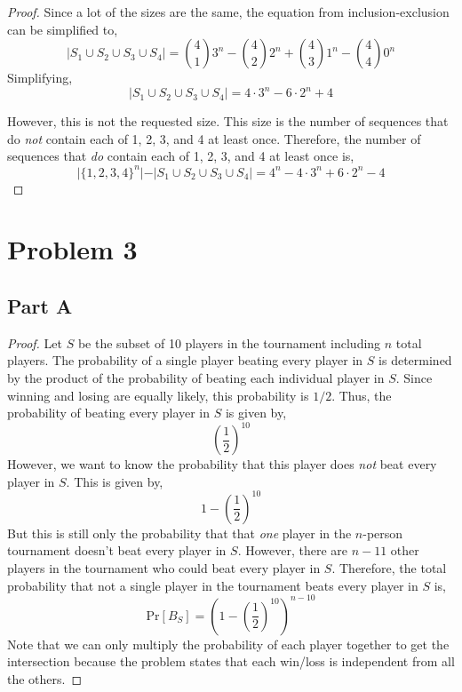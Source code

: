 \documentclass{article}
\begin{document}
\begin{proof}
  Since a lot of the sizes are the same, the equation from inclusion-exclusion
  can be simplified to,
  $$ \vert S_1 \cup S_2 \cup S_3 \cup S_4 \vert = \binom{4}{1} 3^n -
  \binom{4}{2} 2^n + \binom{4}{3} 1^n - \binom{4}{4} 0^n $$
  Simplifying,
  $$ \vert S_1 \cup S_2 \cup S_3 \cup S_4 \vert = 4 \cdot 3^n - 6 \cdot 2^n + 4
  $$

  However, this is not the requested size. This size is the number of sequences
  that do \textit{not} contain each of 1, 2, 3, and 4 at least once. Therefore,
  the number of sequences that \textit{do} contain each of 1, 2, 3, and 4 at
  least once is,
  $$ \vert \{1, 2, 3, 4\}^n \vert - \vert  S_1 \cup S_2 \cup S_3 \cup S_4 \vert
  = 4^n - 4 \cdot 3^n + 6 \cdot 2^n - 4 $$

\end{proof}

\break

\section*{Problem 3}

\subsection*{Part A}

\begin{proof}

  Let $S$ be the subset of 10 players in the tournament including $n$ total
  players. The probability of a single player beating every player in $S$ is
  determined by the product of the probability of beating each individual
  player in $S$. Since winning and losing are equally likely, this probability
  is $1/2$. Thus, the probability of beating every player in $S$ is given by,
  $$ \left( \frac{1}{2} \right)^{10} $$
  However, we want to know the probability that this player does \textit{not}
  beat every player in $S$. This is given by,
  $$ 1 - \left( \frac{1}{2} \right)^{10} $$
  But this is still only the probability that that \textit{one} player in the
  $n$-person tournament doesn't beat every player in $S$. However, there are $n
  - 11$ other players in the tournament who could beat every player in $S$.
  Therefore, the total probability that not a single player in the tournament
  beats every player in $S$ is,
  $$ \mathrm{Pr}[B_S] = \left(1 - \left( \frac{1}{2} \right)^{10} \right)^{n -
  10} $$
  Note that we can only multiply the probability of each player together to get
  the intersection because the problem states that each win/loss is independent
  from all the others.

\end{proof}
\end{document}
